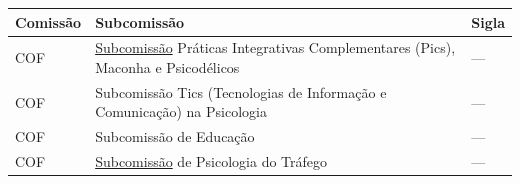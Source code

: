 \begin{longtable}[]{@{}
  >{\centering\arraybackslash}p{}
  >{\centering\arraybackslash}p{}
  >{\centering\arraybackslash}p{}@{}}
  \toprule\noalign{}
  \begin{minipage}[b]{\linewidth}\centering
    \textbf{Comissão}
  \end{minipage}                           & \begin{minipage}[b]{\linewidth}\centering
                                               \textbf{Subcomissão}
                                             \end{minipage}                     & \begin{minipage}[b]{\linewidth}\centering
                                                                                    \textbf{Sigla}
                                                                                  \end{minipage}                  \\
  \midrule\noalign{}
  \endhead
  \bottomrule\noalign{}
  \endlastfoot
  COF                                                                 &
  \href{https://transparencia.cfp.org.br/crp06/legislacao/resolucao-crp-06-no-001-16-de-26-de-agosto-de-2016-cria-a-camara-de-mediacao-da-comissao-de-etica-do-conselho-regional-de-psicologia-da-6a-regiao-crp-06-cam-coe-e-aprova-seu-regulamento/}{Subcomissão}
  Práticas Integrativas Complementares (Pics), Maconha e Psicodélicos &
  ---                                                                                                                                       \\
  COF                                                                 & Subcomissão Tics (Tecnologias de Informação e Comunicação) na
  Psicologia                                                          & ---                                                                 \\
  COF                                                                 & Subcomissão de Educação                                       & --- \\
  COF                                                                 &
  \href{https://transparencia.cfp.org.br/crp06/legislacao/crp-sp-004-2017-cria-e-estabelece-parametros-para-o-funcionamento-da-comissao-de-auditoria-e-controle-interno-do-conselho/}{Subcomissão}
  de Psicologia do Tráfego                                            & ---                                                                 \\

\end{longtable}
